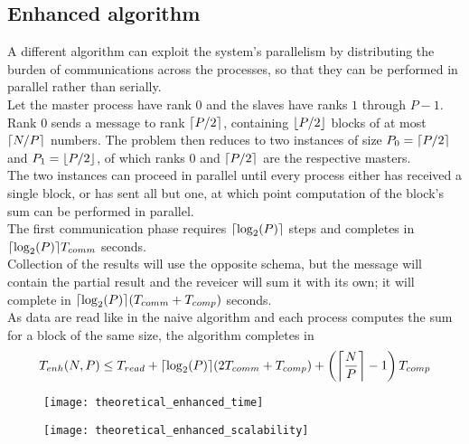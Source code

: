 \documentclass[a4paper, 11pt]{article}
\DeclarePairedDelimiter{\ceil}{\lceil}{\rceil}
\DeclarePairedDelimiter{\floor}{\lfloor}{\rfloor}
\begin{document}
\subsection{Enhanced algorithm}
A different algorithm can exploit the system's parallelism by distributing the burden of communications across the processes, so that they can be performed in parallel rather than serially.\\
Let the master process have rank $0$ and the slaves have ranks $1$ through $P-1$.\\
Rank $0$ sends a message to rank $\ceil*{P/2}$, containing $\floor*{P/2}$ blocks of at most $\ceil{N/P}$ numbers. The problem then reduces to two instances of size $P_{0}=\ceil*{P/2}$ and $P_{1}=\floor*{P/2}$, of which ranks $0$ and $\ceil*{P/2}$ are the respective masters.\\
The two instances can proceed in parallel until every process either has received a single block, or has sent all but one, at which point computation of the block's sum can be performed in parallel.\\
The first communication phase requires $\ceil*{\log_{2}(P)}$ steps and completes in $\ceil*{\log_{2}(P)}T_{comm}$ seconds.\\
Collection of the results will use the opposite schema, but the message will contain the partial result and the reveicer will sum it with its own; it will complete in $\ceil*{\log_{2}(P)}(T_{comm} + T_{comp})$ seconds.\\
As data are read like in the naive algorithm and each process computes the sum for a block of the same size, the algorithm completes in
$$T_{enh}(N, P) \leq T_{read} + \ceil*{\log_{2}(P)} (2T_{comm} + T_{comp}) + \left(\ceil[\bigg]{\frac{N}{P}}-1\right)T_{comp}$$
\begin{figure}[h]
\centering
\begin{minipage}{.5\textwidth}
  \centering
  \texttt{[image: theoretical\_enhanced\_time]}
  \label{fig:theoretical_enhanced_time}
\end{minipage}%
\begin{minipage}{.5\textwidth}
  \centering
  \texttt{[image: theoretical\_enhanced\_scalability]}
  \label{fig:theoretical_enhanced_scalability}
\end{minipage}
\end{figure}
\end{document}

